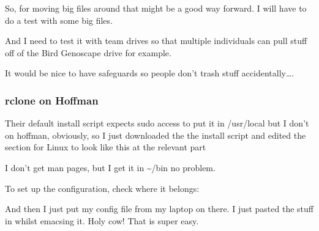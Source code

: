 \documentclass[]{krantz}
\makeatletter
\newenvironment{Shaded}{\begin{snugshade}}{\end{snugshade}}
\newcommand{\CommentTok}[1]{\textcolor[rgb]{0.37,0.37,0.37}{\textit{#1}}}
\newcommand{\ExtensionTok}[1]{#1}
\newcommand{\FunctionTok}[1]{\textcolor[rgb]{0,0,0}{#1}}
\newcommand{\KeywordTok}[1]{\textcolor[rgb]{0.27,0.27,0.27}{\textbf{#1}}}
\newcommand{\NormalTok}[1]{#1}
\newcommand{\StringTok}[1]{\textcolor[rgb]{0.5,0.5,0.5}{#1}}
\newcommand{\VariableTok}[1]{\textcolor[rgb]{0,0,0}{#1}}
\newenvironment{kframe}{%
\medskip{}
\setlength{\fboxsep}{.8em}
 \def\at@end@of@kframe{}%
 \ifinner\ifhmode%
  \def\at@end@of@kframe{\end{minipage}}%
  \begin{minipage}{\columnwidth}%
 \fi\fi%
 \def\FrameCommand##1{\hskip\@totalleftmargin \hskip-\fboxsep
 \colorbox{shadecolor}{##1}\hskip-\fboxsep
     \hskip-\linewidth \hskip-\@totalleftmargin \hskip\columnwidth}%
 \MakeFramed {\advance\hsize-\width
   \@totalleftmargin\z@ \linewidth\hsize
   \@setminipage}}%
 {\par\unskip\endMakeFramed%
 \at@end@of@kframe}
\renewenvironment{Shaded}{\begin{kframe}}{\end{kframe}}
\makeatother
\begin{document}
So, for moving big files around that might be a good way forward. I will have to do a test with some big files.

And I need to test it with team drives so that multiple individuals can pull stuff off of the Bird Genoscape drive for example.

It would be nice to have safeguards so people don't trash stuff accidentally\ldots{}.

\hypertarget{rclone-on-hoffman}{%
\subsubsection{rclone on Hoffman}\label{rclone-on-hoffman}}

Their default install script expects sudo access to put it in /usr/local
but I don't on hoffman, obviously, so I just downloaded the the install script and edited
the section for Linux to look like this at the relevant part

\begin{Shaded}
\end{Shaded}

I don't get man pages, but I get it in \textasciitilde{}/bin no problem.

To set up the configuration, check where it belongs:

\begin{Shaded}
\end{Shaded}

And then I just put my config file from my laptop on there. I just pasted the stuff
in whilst emacsing it. Holy cow! That is super easy.
\end{document}

